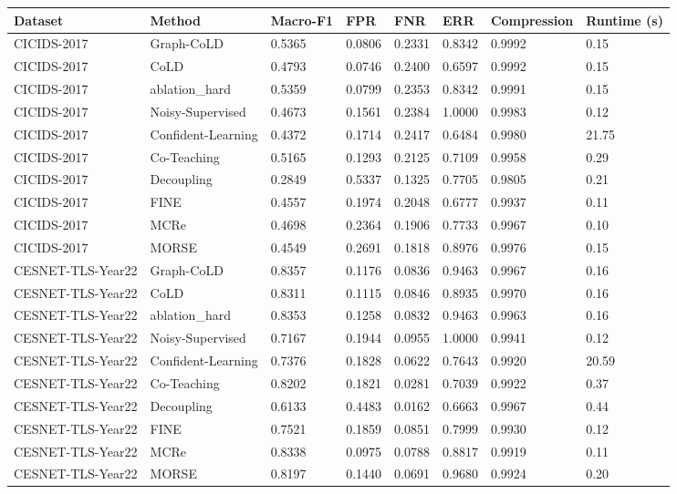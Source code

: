\small
\begin{tabular}{llllllll}
\hline
Dataset & Method & Macro-F1 & FPR & FNR & ERR & Compression & Runtime (s) \\
\hline
CICIDS-2017 & Graph-CoLD & 0.5365 & 0.0806 & 0.2331 & 0.8342 & 0.9992 & 0.15 \\
CICIDS-2017 & CoLD & 0.4793 & 0.0746 & 0.2400 & 0.6597 & 0.9992 & 0.15 \\
CICIDS-2017 & ablation\_hard & 0.5359 & 0.0799 & 0.2353 & 0.8342 & 0.9991 & 0.15 \\
CICIDS-2017 & Noisy-Supervised & 0.4673 & 0.1561 & 0.2384 & 1.0000 & 0.9983 & 0.12 \\
CICIDS-2017 & Confident-Learning & 0.4372 & 0.1714 & 0.2417 & 0.6484 & 0.9980 & 21.75 \\
CICIDS-2017 & Co-Teaching & 0.5165 & 0.1293 & 0.2125 & 0.7109 & 0.9958 & 0.29 \\
CICIDS-2017 & Decoupling & 0.2849 & 0.5337 & 0.1325 & 0.7705 & 0.9805 & 0.21 \\
CICIDS-2017 & FINE & 0.4557 & 0.1974 & 0.2048 & 0.6777 & 0.9937 & 0.11 \\
CICIDS-2017 & MCRe & 0.4698 & 0.2364 & 0.1906 & 0.7733 & 0.9967 & 0.10 \\
CICIDS-2017 & MORSE & 0.4549 & 0.2691 & 0.1818 & 0.8976 & 0.9976 & 0.15 \\
CESNET-TLS-Year22 & Graph-CoLD & 0.8357 & 0.1176 & 0.0836 & 0.9463 & 0.9967 & 0.16 \\
CESNET-TLS-Year22 & CoLD & 0.8311 & 0.1115 & 0.0846 & 0.8935 & 0.9970 & 0.16 \\
CESNET-TLS-Year22 & ablation\_hard & 0.8353 & 0.1258 & 0.0832 & 0.9463 & 0.9963 & 0.16 \\
CESNET-TLS-Year22 & Noisy-Supervised & 0.7167 & 0.1944 & 0.0955 & 1.0000 & 0.9941 & 0.12 \\
CESNET-TLS-Year22 & Confident-Learning & 0.7376 & 0.1828 & 0.0622 & 0.7643 & 0.9920 & 20.59 \\
CESNET-TLS-Year22 & Co-Teaching & 0.8202 & 0.1821 & 0.0281 & 0.7039 & 0.9922 & 0.37 \\
CESNET-TLS-Year22 & Decoupling & 0.6133 & 0.4483 & 0.0162 & 0.6663 & 0.9967 & 0.44 \\
CESNET-TLS-Year22 & FINE & 0.7521 & 0.1859 & 0.0851 & 0.7999 & 0.9930 & 0.12 \\
CESNET-TLS-Year22 & MCRe & 0.8338 & 0.0975 & 0.0788 & 0.8817 & 0.9919 & 0.11 \\
CESNET-TLS-Year22 & MORSE & 0.8197 & 0.1440 & 0.0691 & 0.9680 & 0.9924 & 0.20 \\

\end{tabular}
